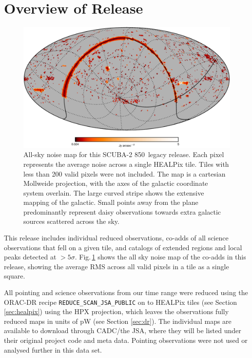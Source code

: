 \documentclass[twocolumn,times]{aastex6}
\newcommand{\um}{\micron}
\begin{document}
\section{Overview of Release}
\begin{figure}
  \centering
  \includegraphics{mollweide-average-noise-galacticaxes-crop}
  \caption{All-sky noise map for this SCUBA-2 850\,\um{} legacy
    release. Each pixel represents the average noise across a single
    HEALPix tile. Tiles with less than 200 valid pixels were not
    included. The map is a cartesian Mollweide projection, with the
    axes of the galactic coordinate system overlain. The large curved
    stripe shows the extensive mapping of the galactic. Small points
    away from the plane predominantly represent daisy observations
    towards extra galactic sources scattered across the sky.}
  \label{fig:noise-mollweide}
\end{figure}

This release includes individual reduced observations, co-adds of all
science observations that fell on a given tile, and catalogs of
extended regions and local peaks detected at
$>5\sigma$. Fig.\,\ref{fig:noise-mollweide} shows the all sky noise map
of the co-adds in this release, showing the average RMS across all
valid pixels in a tile as a single square.

All pointing and science observations from our time range were reduced
using the ORAC-DR recipe \texttt{REDUCE\_SCAN\_JSA\_PUBLIC} on to
HEALPix tiles (see Section \ref{sec:healpix}) using the HPX
projection, which leaves the observations fully reduced maps in units
of pW (see Section \ref{sec:dr}). The individual maps are available to
download through CADC/the JSA, where they will be listed under their
original project code and meta data. Pointing observations were not
used or analysed further in this data set.
\end{document}
